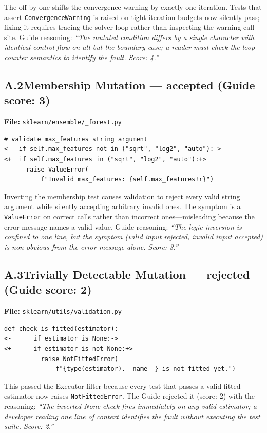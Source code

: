 \documentclass[12pt]{article}
\begin{document}
The off-by-one shifts the convergence warning by exactly one iteration.  Tests
that assert \texttt{ConvergenceWarning} is raised on tight iteration budgets
now silently pass; fixing it requires tracing the solver loop rather than
inspecting the warning call site.  Guide reasoning: \emph{``The mutated
condition differs by a single character with identical control flow on all but
the boundary case; a reader must check the loop counter semantics to identify
the fault. Score: 4.''}

\subsection*{A.2\quad Membership Mutation — accepted (Guide score: 3)}

\noindent\textbf{File:} \texttt{sklearn/ensemble/\_forest.py}

\begin{lstlisting}[style=diff]
  # validate max_features string argument
<-  if self.max_features not in ("sqrt", "log2", "auto"):->
<+  if self.max_features in ("sqrt", "log2", "auto"):+>
      raise ValueError(
          f"Invalid max_features: {self.max_features!r}")
\end{lstlisting}

Inverting the membership test causes validation to reject every valid string
argument while silently accepting arbitrary invalid ones.  The symptom is a
\texttt{ValueError} on correct calls rather than incorrect ones---misleading
because the error message names a valid value.  Guide reasoning: \emph{``The
logic inversion is confined to one line, but the symptom (valid input rejected,
invalid input accepted) is non-obvious from the error message alone. Score:
3.''}

\subsection*{A.3\quad Trivially Detectable Mutation — rejected (Guide score: 2)}

\noindent\textbf{File:} \texttt{sklearn/utils/validation.py}

\begin{lstlisting}[style=diff]
  def check_is_fitted(estimator):
<-      if estimator is None:->
<+      if estimator is not None:+>
          raise NotFittedError(
              f"{type(estimator).__name__} is not fitted yet.")
\end{lstlisting}

This passed the Executor filter because every test that passes a valid fitted
estimator now raises \texttt{NotFittedError}.  The Guide rejected it (score: 2)
with the reasoning: \emph{``The inverted None check fires immediately on any
valid estimator; a developer reading one line of context identifies the fault
without executing the test suite.  Score: 2.''}
\end{document}
